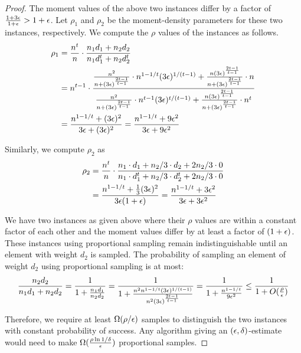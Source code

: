 \begin{proof}
The moment values of the above two instances differ by a factor of $\frac{1+3\epsilon}{1+\epsilon}>1+\epsilon$. Let $\rho_1$ and $\rho_2$ be the moment-density parameters for these two instances, respectively. We compute the $\rho$ values of the instances as follows. 
\begin{align*}
\rho_1 & = \frac{n^t}{n} \cdot \frac{n_1 d_1 + n_2 d_2}{n_1 d_1^t+n_2 d_2^t}\\
& = n^{t-1} \cdot \frac{\frac{n^2}{n +(3 \epsilon)^{\frac{2t-1}{t-1}}} \cdot n^{1-1/t}( 3\epsilon)^{1/(t-1)} + \frac{n (3\epsilon)^{\frac{2t-1}{t-1}}}{n +(3 \epsilon)^{\frac{2t-1}{t-1}}}\cdot n }{\frac{n^2}{n +(3 \epsilon)^{\frac{2t-1}{t-1}}} \cdot n^{t-1}( 3\epsilon)^{t/(t-1)} + \frac{n (3\epsilon)^{\frac{2t-1}{t-1}}}{n +(3 \epsilon)^{\frac{2t-1}{t-1}}}\cdot n^t}\\
&=\frac{n^{1-1/t}+(3\epsilon)^2}{3\epsilon+(3\epsilon)^2}=\frac{n^{1-1/t}+9\epsilon^2}{3\epsilon+9\epsilon^2}
\end{align*}

Similarly, we compute $\rho_2$ as
\begin{align*}
\rho_2 & =\frac{n^t}{n} \cdot \frac{n_1 \cdot d_1 + n_2/3 \cdot d_2 + 2n_2/3 \cdot 0}{n_1 \cdot d_1^t + n_2/3 \cdot d_2^t + 2n_2/3 \cdot 0}\\ 
& = \frac{n^{1-1/t}+\frac{1}{3}(3\epsilon)^2}{3\epsilon(1+\epsilon)}= \frac{n^{1-1/t}+3\epsilon^2}{3\epsilon+3\epsilon^2} 
\end{align*}

We have two instances as given above where their $\rho$ values are within a constant factor of each other and the moment values differ by at least a factor of $(1+\epsilon)$. These instances using proportional sampling remain indistinguishable until an element with weight $d_2$ is sampled. The probability of sampling an element of weight $d_2$ using proportional sampling is at most:
\begin{align*}
\frac{n_2d_2}{n_1d_1+n_2d_2}=\frac{1}{1+\frac{n_1d_1}{n_2d_2}}=\frac{1}{1+\frac{n^2n^{1-1/t}(3\epsilon)^{1/(t-1)}}{n^2(3\epsilon)^{\frac{2t-1}{t-1}}}}=\frac{1}{1+\frac{n^{1-1/t}}{9\epsilon^2}}\leq \frac{1}{1+O(\frac{\rho}{\epsilon})}
\end{align*} 

Therefore, we require at least $\Omega(\rho/\epsilon)$ samples to distinguish the two instances with constant probability of success. Any algorithm giving an $(\epsilon,\delta)$-estimate would need to make $\Omega (\frac{\rho \ln 1/\delta}{\epsilon})$ proportional samples.
\end{proof}
